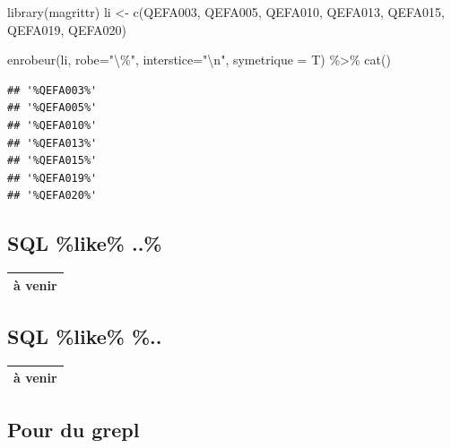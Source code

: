 \documentclass[
]{book}
\newenvironment{Shaded}{\begin{snugshade}}{\end{snugshade}}
\newcommand{\AttributeTok}[1]{\textcolor[rgb]{0.77,0.63,0.00}{#1}}
\newcommand{\FunctionTok}[1]{\textcolor[rgb]{0.00,0.00,0.00}{#1}}
\newcommand{\NormalTok}[1]{#1}
\newcommand{\OtherTok}[1]{\textcolor[rgb]{0.56,0.35,0.01}{#1}}
\newcommand{\SpecialCharTok}[1]{\textcolor[rgb]{0.00,0.00,0.00}{#1}}
\newcommand{\StringTok}[1]{\textcolor[rgb]{0.31,0.60,0.02}{#1}}
\begin{document}
\begin{Shaded}
\begin{Highlighting}[]
\FunctionTok{library}\NormalTok{(magrittr)}
\NormalTok{li }\OtherTok{\textless{}{-}} \FunctionTok{c}\NormalTok{(}\StringTok{\textquotesingle{}QEFA003\textquotesingle{}}\NormalTok{, }\StringTok{\textquotesingle{}QEFA005\textquotesingle{}}\NormalTok{, }\StringTok{\textquotesingle{}QEFA010\textquotesingle{}}\NormalTok{, }\StringTok{\textquotesingle{}QEFA013\textquotesingle{}}\NormalTok{, }\StringTok{\textquotesingle{}QEFA015\textquotesingle{}}\NormalTok{, }\StringTok{\textquotesingle{}QEFA019\textquotesingle{}}\NormalTok{, }\StringTok{\textquotesingle{}QEFA020\textquotesingle{}}\NormalTok{)}

\FunctionTok{enrobeur}\NormalTok{(li, }\AttributeTok{robe=}\StringTok{"}\SpecialCharTok{\textbackslash{}\textquotesingle{}}\StringTok{\%"}\NormalTok{, }\AttributeTok{interstice=}\StringTok{"}\SpecialCharTok{\textbackslash{}n}\StringTok{"}\NormalTok{, }\AttributeTok{symetrique =}\NormalTok{ T) }\SpecialCharTok{\%\textgreater{}\%} \FunctionTok{cat}\NormalTok{()}
\end{Highlighting}
\end{Shaded}

\begin{verbatim}
## '%QEFA003%'
## '%QEFA005%'
## '%QEFA010%'
## '%QEFA013%'
## '%QEFA015%'
## '%QEFA019%'
## '%QEFA020%'
\end{verbatim}

\hypertarget{sql-like-..}{%
\subsection{SQL \%like\% ..\%}\label{sql-like-..}}

\begin{longtable}[]{@{}l@{}}
\toprule()
\endhead
à venir \\
\bottomrule()
\end{longtable}

\hypertarget{sql-like-..-1}{%
\subsection{SQL \%like\% \%..}\label{sql-like-..-1}}

\begin{longtable}[]{@{}l@{}}
\toprule()
\endhead
à venir \\
\bottomrule()
\end{longtable}

\hypertarget{pour-du-grepl}{%
\subsection{Pour du grepl}\label{pour-du-grepl}}
\end{document}
